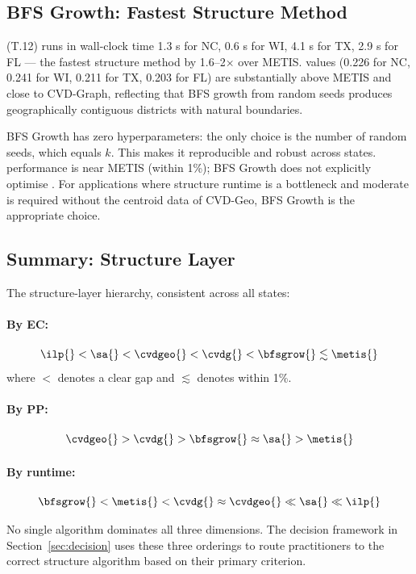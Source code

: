 \subsection{BFS Growth: Fastest Structure Method}

\bfsgrow{} (T.12) runs in wall-clock time 1.3 s for NC, 0.6 s for WI,
4.1 s for TX, 2.9 s for FL --- the fastest structure method by 1.6--2$\times$
over METIS.
\pp{} values (0.226 for NC, 0.241 for WI, 0.211 for TX, 0.203 for FL) are
substantially above METIS and close to CVD-Graph, reflecting that BFS growth
from random seeds produces geographically contiguous districts with natural
boundaries.

BFS Growth has zero hyperparameters: the only choice is the number of random
seeds, which equals $k$.
This makes it reproducible and robust across states.
\ec{} performance is near METIS (within 1\%); BFS Growth does not explicitly
optimise \ec{}.
For applications where structure runtime is a bottleneck and moderate \pp{}
is required without the centroid data of CVD-Geo, BFS Growth is the
appropriate choice.

\subsection{Summary: Structure Layer}

The structure-layer hierarchy, consistent across all states:

\paragraph{By EC:}
\[
  \ilp{} < \sa{} < \cvdgeo{} < \cvdg{} < \bfsgrow{} \lesssim \metis{}
\]
where $<$ denotes a clear gap and $\lesssim$ denotes within 1\%.

\paragraph{By PP:}
\[
  \cvdgeo{} > \cvdg{} > \bfsgrow{} \approx \sa{} > \metis{}
\]

\paragraph{By runtime:}
\[
  \bfsgrow{} < \metis{} < \cvdg{} \approx \cvdgeo{} \ll \sa{} \ll \ilp{}
\]

No single algorithm dominates all three dimensions.
The decision framework in Section~\ref{sec:decision} uses these three
orderings to route practitioners to the correct structure algorithm
based on their primary criterion.
